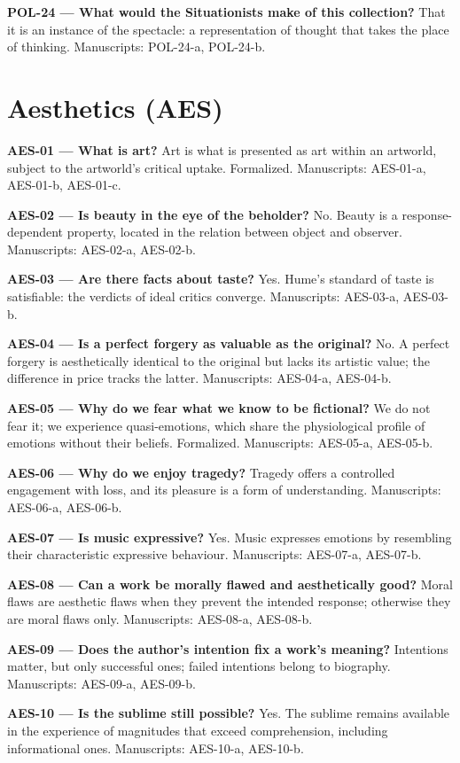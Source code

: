 \documentclass[10pt]{article}
\begin{document}
\textbf{POL-24 --- What would the Situationists make of this collection?} That it is an instance of the spectacle: a representation of thought that takes the place of thinking. Manuscripts: POL-24-a, POL-24-b.

\section*{Aesthetics (AES)}
\textbf{AES-01 --- What is art?} Art is what is presented as art within an artworld, subject to the artworld's critical uptake. Formalized. Manuscripts: AES-01-a, AES-01-b, AES-01-c.

\textbf{AES-02 --- Is beauty in the eye of the beholder?} No. Beauty is a response-dependent property, located in the relation between object and observer. Manuscripts: AES-02-a, AES-02-b.

\textbf{AES-03 --- Are there facts about taste?} Yes. Hume's standard of taste is satisfiable: the verdicts of ideal critics converge. Manuscripts: AES-03-a, AES-03-b.

\textbf{AES-04 --- Is a perfect forgery as valuable as the original?} No. A perfect forgery is aesthetically identical to the original but lacks its artistic value; the difference in price tracks the latter. Manuscripts: AES-04-a, AES-04-b.

\textbf{AES-05 --- Why do we fear what we know to be fictional?} We do not fear it; we experience quasi-emotions, which share the physiological profile of emotions without their beliefs. Formalized. Manuscripts: AES-05-a, AES-05-b.

\textbf{AES-06 --- Why do we enjoy tragedy?} Tragedy offers a controlled engagement with loss, and its pleasure is a form of understanding. Manuscripts: AES-06-a, AES-06-b.

\textbf{AES-07 --- Is music expressive?} Yes. Music expresses emotions by resembling their characteristic expressive behaviour. Manuscripts: AES-07-a, AES-07-b.

\textbf{AES-08 --- Can a work be morally flawed and aesthetically good?} Moral flaws are aesthetic flaws when they prevent the intended response; otherwise they are moral flaws only. Manuscripts: AES-08-a, AES-08-b.

\textbf{AES-09 --- Does the author's intention fix a work's meaning?} Intentions matter, but only successful ones; failed intentions belong to biography. Manuscripts: AES-09-a, AES-09-b.

\textbf{AES-10 --- Is the sublime still possible?} Yes. The sublime remains available in the experience of magnitudes that exceed comprehension, including informational ones. Manuscripts: AES-10-a, AES-10-b.
\end{document}
